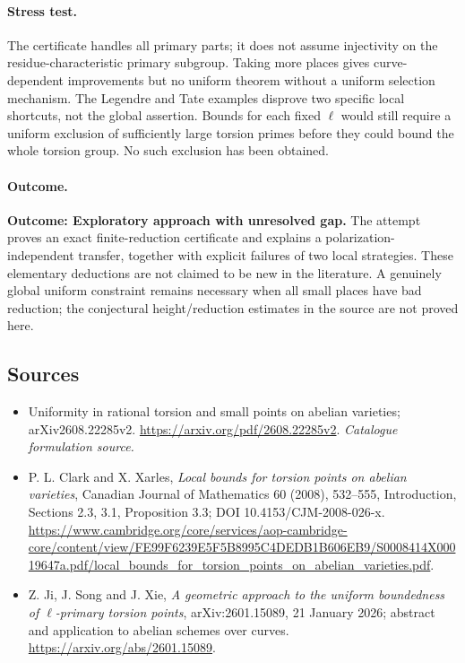 \documentclass[11pt,a4paper]{article}
\numberwithin{equation}{section}
\begin{document}
\paragraph{Stress test.}
The certificate handles all primary parts; it does not assume injectivity
on the residue-characteristic primary subgroup. Taking more places gives
curve-dependent improvements but no uniform theorem without a uniform
selection mechanism. The Legendre and Tate examples disprove two specific
local shortcuts, not the global assertion. Bounds for each fixed $\ell$
would still require a uniform exclusion of sufficiently large torsion
primes before they could bound the whole torsion group. No such exclusion
has been obtained.

\paragraph{Outcome.}
\textbf{Outcome: Exploratory approach with unresolved gap.}
The attempt proves an exact finite-reduction certificate and explains a
polarization-independent transfer, together with explicit failures of two
local strategies. These elementary deductions are not claimed to be new
in the literature. A genuinely global uniform constraint remains necessary
when all small places have bad reduction; the conjectural height/reduction
estimates in the source are not proved here.

\subsection{Sources}
\begin{itemize}\raggedright
\item[\textnormal{[S1]}]\hypertarget{source:30006748:1}{} Uniformity in rational torsion and small points on abelian varieties; arXiv2608.22285v2.
\url{https://arxiv.org/pdf/2608.22285v2}.
{\small\textit{Catalogue formulation source.}}
\item[\textnormal{[E1]}]\hypertarget{extra:30006748:1}{} P. L. Clark and X. Xarles,
\emph{Local bounds for torsion points on abelian varieties}, Canadian Journal
of Mathematics 60 (2008), 532--555, Introduction, Sections 2.3, 3.1,
Proposition 3.3; DOI 10.4153/CJM-2008-026-x.
\url{https://www.cambridge.org/core/services/aop-cambridge-core/content/view/FE99F6239E5F5B8995C4DEDB1B606EB9/S0008414X00019647a.pdf/local_bounds_for_torsion_points_on_abelian_varieties.pdf}.
\item[\textnormal{[E2]}]\hypertarget{extra:30006748:2}{} Z. Ji, J. Song and J. Xie,
\emph{A geometric approach to the uniform boundedness of $\ell$-primary
torsion points}, arXiv:2601.15089, 21 January 2026; abstract and application
to abelian schemes over curves. \url{https://arxiv.org/abs/2601.15089}.

\end{itemize}
\end{document}
